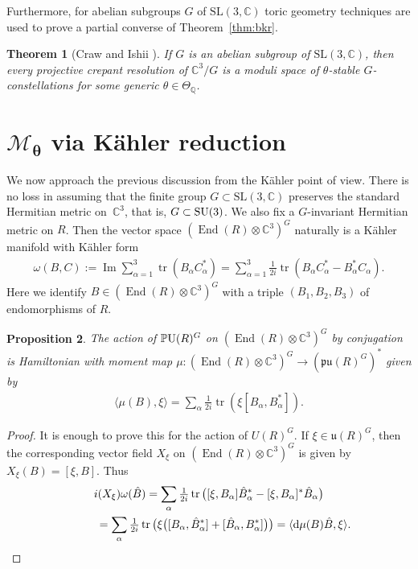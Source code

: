 \documentclass[pdftex]{sigma}
\numberwithin{equation}{section}
\newcommand{\rd}{{\rm d}}
\newcommand{\sM}{\mathscr{M}}
\newcommand{\fu}{{\mathfrak u}}
\newcommand{\Q}{{\mathbb Q}}
\newcommand{\C}{{\mathbb C}}
\newcommand{\fpu}{\mathfrak{pu}}
\newcommand{\SU}{{\rm SU}}
\newcommand{\SL}{\mathrm{SL}}
\newcommand{\PU}{{\mathbb P}{\rm U}}
\newcommand{\End}{\operatorname{End}}
\newcommand{\tr}{\operatorname{tr}}
\newtheorem{Theorem}{Theorem}[section]
\newtheorem{Proposition}[Theorem]{Proposition}
 { \theoremstyle{definition}
\newtheorem{Definition}[Theorem]{Definition}
\newtheorem{Remark}[Theorem]{Remark} }
\begin{document}
Furthermore, for abelian subgroups $G$ of $\SL(3,\C)$ toric geometry
techniques are used to prove a partial converse of
Theorem~\ref{thm:bkr}.

\begin{Theorem}[Craw and Ishii ]\label{thm:ci-2}
  If $G$ is an abelian subgroup of $\SL(3,\C)$, then every projective
  crepant resolution of $\C^3/G$ is a moduli space of $\theta$-stable
  $G$-constellations for some generic $\theta\in\Theta_{\Q}$.
\end{Theorem}


\section[$\sM_\theta$ via K\"ahler reduction]{$\boldsymbol{\sM_\theta}$ via K\"ahler reduction}
\label{sec:kq}

We now approach the previous discussion from the K\"ahler point of view.
There is no loss in assuming that the f\/inite group $G\subset\SL(3,\C)$
preserves the standard Hermitian metric on~$\C^3$, that is,
$G\subset\SU(3)$.  We also f\/ix a $G$-invariant Hermitian metric on
$R$.
Then the vector space $(\End(R)\otimes\C^3)^G$ naturally is a K\"ahler
manifold with K\"ahler form
\begin{gather*}
  \omega(B,C)
  := \operatorname{Im} \sum_{\alpha=1}^3 \tr(B_\alpha C_\alpha^*)
   = \sum_{\alpha=1}^3 \tfrac{1}{2i}\tr(B_\alpha C_\alpha^*-B_\alpha^*C_\alpha).
\end{gather*}
Here we identify $B\in(\End(R)\otimes\C^3)^G$ with a triple
$(B_1,B_2,B_3)$ of endomorphisms of $R$.

\begin{Proposition}
  The action of $\PU(R)^G$ on $(\End(R)\otimes\C^3)^G$ by conjugation
  is Hamiltonian with moment map $\mu\colon (\End(R)\otimes\C^3)^G\to
  (\fpu(R)^G)^*$ given by
  \begin{gather*}
    \langle \mu(B),\xi\rangle =\sum_\alpha \tfrac{1}{2i} \tr(\xi
    [B_\alpha,B_\alpha^*]).
  \end{gather*}
\end{Proposition}

\begin{proof}
  It is enough to prove this for the action of $U(R)^G$.  If
  $\xi\in\fu(R)^G$, then the corresponding vector f\/ield $X_\xi$ on
  $(\End(R)\otimes\C^3)^G$ is given by $X_\xi(B) = [\xi,B].$ Thus
  \begin{gather*}
    i(X_\xi)\omega(\hat B)
      =\sum_\alpha \tfrac{1}{2i}\tr\big([\xi,B_\alpha] \hat
     B_\alpha^*-[\xi,B_\alpha]^*\hat B_\alpha\big) \\
\hphantom{i(X_\xi)\omega(\hat B)}{}
=\sum_\alpha \tfrac{1}{2i}\tr\big(\xi\big([B_\alpha,\hat
     B_\alpha^*]+[\hat B_\alpha,B_\alpha^*]\big)\big)
     =\langle \rd\mu(B)\hat B,\xi\rangle .\tag*{\qed}
  \end{gather*}
  \renewcommand{\qed}{}
\end{proof}
\end{document}
